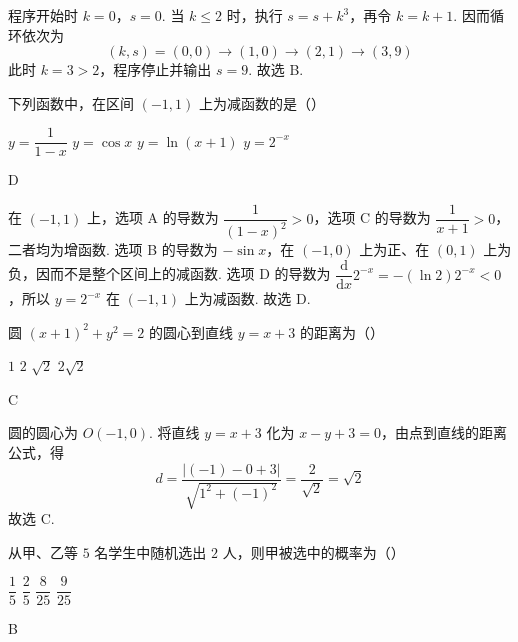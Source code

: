 \begin{solution}
程序开始时 \(k=0\)，\(s=0\). 当 \(k\leq2\) 时，执行 \(s=s+k^3\)，再令 \(k=k+1\). 因而循环依次为
\[
(k,s)=(0,0)\longrightarrow(1,0)\longrightarrow(2,1)\longrightarrow(3,9)
\]
此时 \(k=3>2\)，程序停止并输出 \(s=9\). 故选 B.
\end{solution}

\begin{problem}
下列函数中，在区间 \((-1,1)\) 上为减函数的是（\quad）

\choices
    {\(y=\dfrac{1}{1-x}\)}
    {\(y=\cos x\)}
    {\(y=\ln\left( x+1 \right)\)}
    {\(y=2^{-x}\)}
\end{problem}

\begin{answer}
D
\end{answer}

\begin{solution}
在 \((-1,1)\) 上，选项 A 的导数为 \(\dfrac{1}{(1-x)^2}>0\)，选项 C 的导数为 \(\dfrac{1}{x+1}>0\)，二者均为增函数. 选项 B 的导数为 \(-\sin x\)，在 \((-1,0)\) 上为正、在 \((0,1)\) 上为负，因而不是整个区间上的减函数. 选项 D 的导数为 \(\dfrac{\mathrm d}{\mathrm dx}2^{-x}=-(\ln2)2^{-x}<0\)，所以 \(y=2^{-x}\) 在 \((-1,1)\) 上为减函数. 故选 D.
\end{solution}

\begin{problem}
圆 \(\left( x+1 \right)^2+y^2=2\) 的圆心到直线 \(y=x+3\) 的距离为（\quad）

\choices
    {\(1\)}
    {\(2\)}
    {\(\sqrt2\)}
    {\(2\sqrt2\)}
\end{problem}

\begin{answer}
C
\end{answer}

\begin{solution}
圆的圆心为 \(O(-1,0)\). 将直线 \(y=x+3\) 化为 \(x-y+3=0\)，由点到直线的距离公式，得
\[
d=\frac{|(-1)-0+3|}{\sqrt{1^2+(-1)^2}}=\frac{2}{\sqrt2}=\sqrt2
\]
故选 C.
\end{solution}

\begin{problem}
从甲、乙等 \(5\) 名学生中随机选出 \(2\) 人，则甲被选中的概率为（\quad）

\choices
    {\(\dfrac15\)}
    {\(\dfrac25\)}
    {\(\dfrac{8}{25}\)}
    {\(\dfrac{9}{25}\)}
\end{problem}

\begin{answer}
B
\end{answer}

